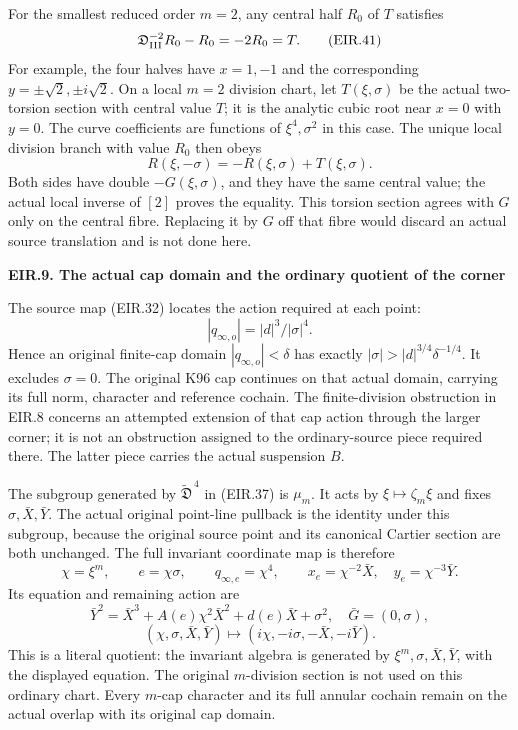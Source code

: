 For the smallest reduced order \(m=2\), any central
half \(R_0\) of \(T\) satisfies
\[
 \mathfrak D_{\rm III}^{-2}R_0-R_0
                  =-2R_0=T.
 \tag{EIR.41}
\]
For example, the four halves have \(x=1,-1\) and
the corresponding \(y=\pm\sqrt2,\pm i\sqrt2\).
On a local \(m=2\) division chart, let \(T(\xi,\sigma)\)
be the actual two-torsion section with central value
\(T\); it is the analytic cubic root near \(x=0\) with
\(y=0\). The curve coefficients are functions of
\(\xi^4,\sigma^2\) in this case. The unique local
division branch with value \(R_0\) then obeys
\[
 R(\xi,-\sigma)=-R(\xi,\sigma)+T(\xi,\sigma).
 \tag{EIR.42}
\]
Both sides have double \(-G(\xi,\sigma)\), and they
have the same central value; the actual local inverse
of \([2]\) proves the equality. This torsion section
agrees with \(G\) only on the central fibre. Replacing
it by \(G\) off that fibre would discard an actual
source translation and is not done here.

\par

\medskip\noindent\textbf{EIR.9. The actual cap domain and the ordinary quotient of the corner}

\par\nobreak

The source map (EIR.32) locates the action required at each point:
\[
 |q_{\infty,o}|=|d|^3/|\sigma|^4.
\]
Hence an original finite-cap domain \(|q_{\infty,o}|<\delta\)
has exactly \(|\sigma|>|d|^{3/4}\delta^{-1/4}\).
It excludes \(\sigma=0\). The original K96 cap continues on
that actual domain, carrying its full norm, character and reference
cochain. The finite-division obstruction in EIR.8 concerns an attempted
extension of that cap action through the larger corner; it is not an
obstruction assigned to the ordinary-source piece required there.
The latter piece carries the actual suspension \(B\).

The subgroup generated by \(\widetilde{\mathfrak D}^{\,4}\)
in (EIR.37) is \(\mu_m\). It acts by
\(\xi\mapsto\zeta_m\xi\) and fixes
\(\sigma,\bar X,\bar Y\). The actual original point-line
pullback is the identity under this subgroup, because the original
source point and its canonical Cartier section are both unchanged.
The full invariant coordinate map is therefore
\[
 \chi=\xi^m,\qquad
 e=\chi\sigma,\qquad q_{\infty,e}=\chi^4,
 \qquad x_e=\chi^{-2}\bar X,\quad
 y_e=\chi^{-3}\bar Y.
 \tag{EIR.43}
\]
Its equation and remaining action are
\[
 \bar Y^2=\bar X^3+A(e)\chi^2\bar X^2
                    +d(e)\bar X+\sigma^2,
 \quad \bar G=(0,\sigma),
\]
\[
 (\chi,\sigma,\bar X,\bar Y)\longmapsto
           (i\chi,-i\sigma,-\bar X,-i\bar Y).
 \tag{EIR.44}
\]
This is a literal quotient: the invariant algebra is generated by
\(\xi^m,\sigma,\bar X,\bar Y\), with the displayed equation.
The original \(m\)-division section is not used on this ordinary
chart. Every \(m\)-cap character and its full annular cochain remain
on the actual overlap with its original cap domain.

